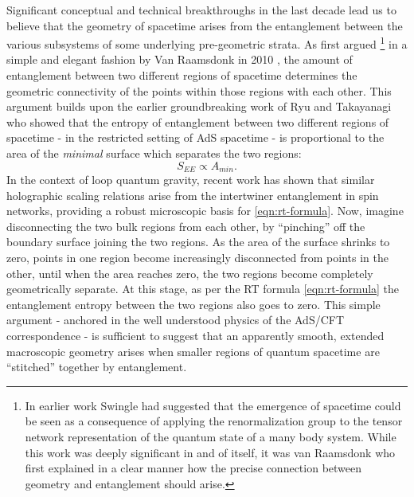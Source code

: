 \documentclass[preprint]{SciPost}
\theoremstyle{plain} %
\begin{document}
Significant conceptual and technical breakthroughs \cite{Van-Raamsdonk2010Building,Swingle2012Constructing} in the last decade lead us to believe that the geometry of spacetime arises from the entanglement between the various subsystems of some underlying pre-geometric strata. As first argued \footnote{In earlier work \cite{Swingle2009Entanglement} Swingle had suggested that the emergence of spacetime could be seen as a consequence of applying the renormalization group to the tensor network representation of the quantum state of a many body system. While this work was deeply significant in and of itself, it was van Raamsdonk who first explained in a clear manner how the precise connection between geometry and entanglement should arise.} in a simple and elegant fashion by Van Raamsdonk in 2010 \cite{Van-Raamsdonk2010Building}, the amount of entanglement between two different regions of spacetime determines the geometric connectivity of the points within those regions with each other. This argument builds upon the earlier groundbreaking work of Ryu and Takayanagi \cite{Ryu2006Holographic,Ryu2006Aspects} who showed that the entropy of entanglement between two different regions of spacetime - in the restricted setting of AdS spacetime - is proportional to the area of the \emph{minimal} surface which separates the two regions:
\begin{equation}\label{eqn:rt-formula}
	S_{EE} \propto A_{min}.
\end{equation}
In the context of loop quantum gravity, recent work \cite{Colafranceschi2022Holographic,Livine2018Intertwiner,Baytas2018Gluing} has shown that similar holographic scaling relations arise from the intertwiner entanglement in spin networks, providing a robust microscopic basis for \eqref{eqn:rt-formula}.
Now, imagine disconnecting the two bulk regions from each other, by ``pinching'' off the boundary surface joining the two regions. As the area of the surface shrinks to zero, points in one region become increasingly disconnected from points in the other, until when the area reaches zero, the two regions become completely geometrically separate. At this stage, as per the RT formula \eqref{eqn:rt-formula} the entanglement entropy between the two regions also goes to zero. This simple argument - anchored in the well understood physics of the AdS/CFT correspondence - is sufficient to suggest that an apparently smooth, extended macroscopic geometry arises when smaller regions of quantum spacetime are ``stitched'' together by entanglement.
\end{document}
